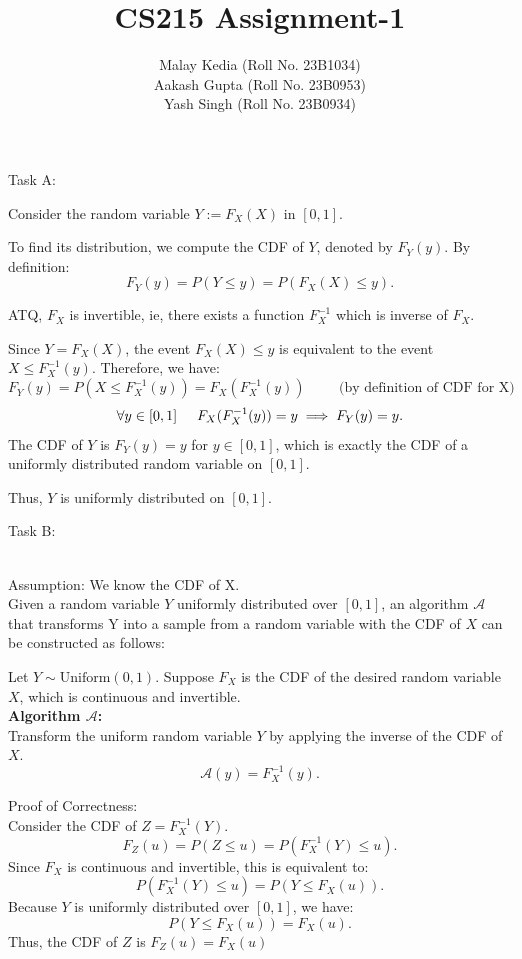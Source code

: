 \documentclass[a4paper,answers]{exam}
\title{CS215 Assignment-1}
\author{Malay Kedia (Roll No. 23B1034) \\ Aakash Gupta (Roll No. 23B0953) \\ Yash Singh (Roll No. 23B0934)}
\date{}
\begin{document}
\maketitle

\begin{questions}



Task A:
\begin{solution}
Consider the random variable \( Y := F_X(X) \) in \([0,1]\).

To find its distribution, we compute the CDF of \( Y \), denoted by \( F_Y(y) \). By definition:
   \[
   F_Y(y) = P(Y \leq y) = P(F_X(X) \leq y).
   \]

ATQ, \( F_X \) is invertible, ie, there exists a function \( F_X^{-1} \) which is inverse of $F_X$. 

Since \( Y = F_X(X) \), the event \( F_X(X) \leq y \) is equivalent to the event \( X \leq F_X^{-1}(y) \). Therefore, we have:
   \[
   F_Y(y) = P(X \leq F_X^{-1}(y)) = F_X(F_X^{-1}(y)) \hspace{1cm} \text{(by definition of CDF for X)}
   \]
   \[ \forall y \in [0, 1] \hspace{0.5cm} F_X(F_X^{-1}(y)) = y  \implies F_Y(y) = y.
   \]
The CDF of \( Y \) is \( F_Y(y) = y \) for \( y \in [0, 1] \), which is exactly the CDF of a uniformly distributed random variable on \([0, 1]\).

Thus, \( Y \) is uniformly distributed on \([0, 1]\).
\end{solution}

Task B:
\begin{solution}\\
Assumption: We know the CDF of X.\\
Given a random variable \( Y \) uniformly distributed over \([0,1]\), an algorithm \( \mathcal{A} \) that transforms Y into a sample from a random variable with the CDF of \( X \) can be constructed as follows:

Let \( Y \sim \text{Uniform}(0,1) \). Suppose \( F_X \) is the CDF of the desired random variable \( X \), which is continuous and invertible.\\
\textbf{Algorithm \( \mathcal{A} \):}\\
Transform the uniform random variable \( Y \) by applying the inverse of the CDF of \( X \).
 \[
 \mathcal{A}(y) = F_X^{-1}(y).
 \]

Proof of Correctness:\\
Consider the CDF of \( Z = F_X^{-1}(Y) \).
     \[
     F_Z(u)= P(Z \leq u) = P(F_X^{-1}(Y) \leq u).
     \]
Since \( F_X \) is continuous and invertible, this is equivalent to:
     \[
     P(F_X^{-1}(Y) \leq u) = P(Y \leq F_X(u)).
     \]
Because \( Y \) is uniformly distributed over \([0,1]\), we have:
     \[
     P(Y \leq F_X(u)) = F_X(u).
     \]
Thus, the CDF of \( Z \) is \( F_Z(u) = F_X(u) \)
   

\end{solution}
\end{questions}
\end{document}
